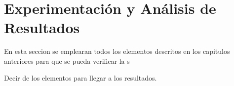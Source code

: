 \documentclass[class=report, crop=false]{standalone}
\begin{document}
\chapter{Experimentación y Análisis de Resultados}

En esta seccion se emplearan todos los elementos descritos en los capitulos anteriores para que se pueda
verificar la s

Decir de los elementos para llegar a los \cite{b7} resultados.

\end{document}

